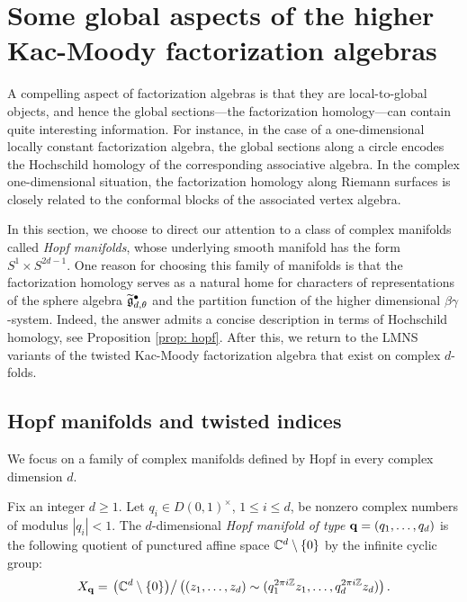 \section{Some global aspects of the higher Kac-Moody factorization algebras}

A compelling aspect of factorization algebras is that they are local-to-global objects,
and hence the global sections---the factorization homology---can contain quite interesting information.
For instance, in the case of a one-dimensional locally constant factorization algebra, the global sections along a circle encodes the Hochschild homology of the corresponding associative algebra. 
In the complex one-dimensional situation, the factorization homology along Riemann surfaces is closely related to the conformal blocks of the associated vertex algebra. 

In this section, we choose to direct our attention to a class of complex manifolds called {\em Hopf manifolds},
whose underlying smooth manifold has the form $S^1 \times S^{2d-1}$.
One reason for choosing this family of manifolds is that the factorization homology serves as a natural home for characters of representations of the sphere algebra $\widetilde{\mathfrak g}_{d,\theta}^\bullet$ and the partition function of the higher dimensional $\beta\gamma$-system. 
Indeed, the answer admits a concise description in terms of Hochschild homology, see Proposition \ref{prop: hopf}. 
After this, we return to the LMNS variants of the twisted Kac-Moody factorization algebra that exist on complex $d$-folds.

\subsection{Hopf manifolds and twisted indices}

We focus on a family of complex manifolds defined by Hopf \cite{Hopf} in every complex dimension $d$. 

\begin{dfn}
Fix an integer $d \geq 1$. 
Let $q_i \in D(0,1)^{\times}$, $1 \leq i \leq d$, be nonzero complex numbers of modulus $|q_i| <1$. 
The $d$-dimensional {\em Hopf manifold of type} ${\bf q} = (q_1,\ldots,q_d)$ is the following quotient of punctured affine space $\mathbb C^d \setminus \{0\}$ by the infinite cyclic group:
\[
X_{\bf q} = \left. \left(\mathbb C^d \setminus \{0\}\right) \right/ \left( (z_1,\ldots,z_d) \sim (q_1^{2\pi i \mathbb Z} z_1, \ldots,q_d^{2 \pi i \mathbb Z} z_d) \right) .
\]
\end{dfn}

